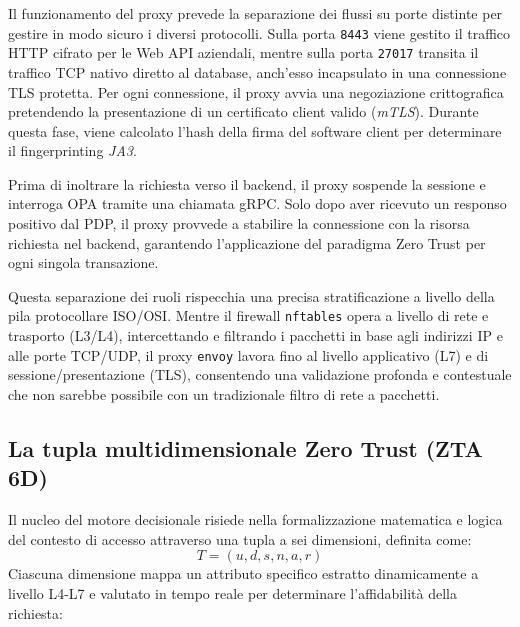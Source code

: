 Il funzionamento del proxy prevede la separazione dei flussi su porte distinte per gestire in modo sicuro i diversi protocolli. Sulla porta \texttt{8443} viene gestito il traffico HTTP cifrato per le Web API aziendali, mentre sulla porta \texttt{27017} transita il traffico TCP nativo diretto al database, anch'esso incapsulato in una connessione TLS protetta. Per ogni connessione, il proxy avvia una negoziazione crittografica pretendendo la presentazione di un certificato client valido (\textit{mTLS}). Durante questa fase, viene calcolato l'hash della firma del software client per determinare il fingerprinting \textit{JA3}.

Prima di inoltrare la richiesta verso il backend, il proxy sospende la sessione e interroga OPA tramite una chiamata gRPC. Solo dopo aver ricevuto un responso positivo dal PDP, il proxy provvede a stabilire la connessione con la risorsa richiesta nel backend, garantendo l'applicazione del paradigma Zero Trust per ogni singola transazione.

Questa separazione dei ruoli rispecchia una precisa stratificazione a livello della pila protocollare ISO/OSI. Mentre il firewall \texttt{nftables} opera a livello di rete e trasporto (L3/L4), intercettando e filtrando i pacchetti in base agli indirizzi IP e alle porte TCP/UDP, il proxy \texttt{envoy} lavora fino al livello applicativo (L7) e di sessione/presentazione (TLS), consentendo una validazione profonda e contestuale che non sarebbe possibile con un tradizionale filtro di rete a pacchetti.

\subsection{La tupla multidimensionale Zero Trust (ZTA 6D)}
Il nucleo del motore decisionale risiede nella formalizzazione matematica e logica del contesto di accesso attraverso una tupla a sei dimensioni, definita come:
\begin{equation}
T = (u, d, s, n, a, r)
\end{equation}
Ciascuna dimensione mappa un attributo specifico estratto dinamicamente a livello L4-L7 e valutato in tempo reale per determinare l'affidabilità della richiesta:

